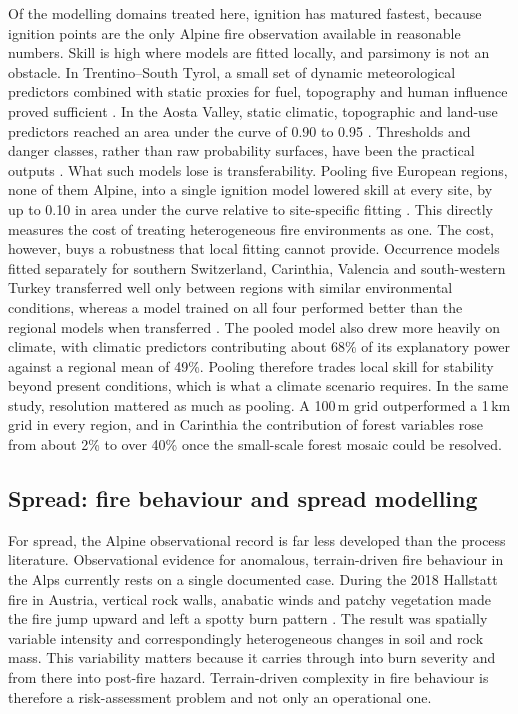 \documentclass[11pt,a4paper]{article}
\begin{document}
Of the modelling domains treated here, ignition has matured fastest, because ignition points are the only Alpine fire observation available in reasonable numbers. Skill is high where models are fitted locally, and parsimony is not an obstacle. In Trentino--South Tyrol, a small set of dynamic meteorological predictors combined with static proxies for fuel, topography and human influence proved sufficient \citep{moreno_spacetime_2025}. In the Aosta Valley, static climatic, topographic and land-use predictors reached an area under the curve of 0.90 to 0.95 \citep{vacchiano_modeling_2018}. Thresholds and danger classes, rather than raw probability surfaces, have been the practical outputs \citep{moreno_spacetime_2025, arndt_modeling_2013}. What such models lose is transferability. Pooling five European regions, none of them Alpine, into a single ignition model lowered skill at every site, by up to 0.10 in area under the curve relative to site-specific fitting \citep{gelabert_assessing_2025}. This directly measures the cost of treating heterogeneous fire environments as one. The cost, however, buys a robustness that local fitting cannot provide. Occurrence models fitted separately for southern Switzerland, Carinthia, Valencia and south-western Turkey transferred well only between regions with similar environmental conditions, whereas a model trained on all four performed better than the regional models when transferred \citep{bekar_crossregional_2020}. The pooled model also drew more heavily on climate, with climatic predictors contributing about 68\% of its explanatory power against a regional mean of 49\%. Pooling therefore trades local skill for stability beyond present conditions, which is what a climate scenario requires. In the same study, resolution mattered as much as pooling. A 100\,m grid outperformed a 1\,km grid in every region, and in Carinthia the contribution of forest variables rose from about 2\% to over 40\% once the small-scale forest mosaic could be resolved.

\subsection{Spread: fire behaviour and spread modelling}

For spread, the Alpine observational record is far less developed than the process literature. Observational evidence for anomalous, terrain-driven fire behaviour in the Alps currently rests on a single documented case. During the 2018 Hallstatt fire in Austria, vertical rock walls, anabatic winds and patchy vegetation made the fire jump upward and left a spotty burn pattern \citep{melzner_brief_2019}. The result was spatially variable intensity and correspondingly heterogeneous changes in soil and rock mass. This variability matters because it carries through into burn severity and from there into post-fire hazard. Terrain-driven complexity in fire behaviour is therefore a risk-assessment problem and not only an operational one.
\end{document}
